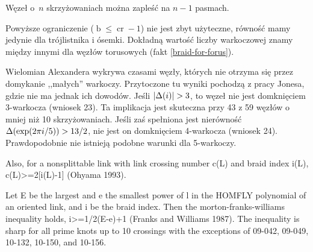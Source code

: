 \begin{proposition}
    Węzeł o~$n$ skrzyżowaniach można zapleść na $n - 1$ pasmach.
\end{proposition}

Powyższe ograniczenie ($\operatorname{b} \le \operatorname{cr} - 1$) nie jest zbyt użyteczne, równość mamy jedynie dla trójlistnika i ósemki.
Dokładną wartość liczby warkoczowej znamy między innymi dla węzłów torusowych (fakt \ref{braid-for-forus}).

Wielomian Alexandera wykrywa czasami węzły, których nie otrzyma się przez domykanie ,,małych'' warkoczy.
Przytoczone tu wyniki pochodzą z pracy \cite{jones85} Jonesa, gdzie nie ma jednak ich dowodów.
Jeśli $|\Delta(i)| > 3$, to węzeł nie jest domknięciem 3-warkocza (wniosek 23).
Ta implikacja jest skuteczna przy 43 z 59 węzłów o mniej niż 10 skrzyżowaniach.
Jeśli zaś spełniona jest nierówność $\Delta (\exp (2\pi i / 5)) > 13/2$, nie jest on domknięciem 4-warkocza (wniosek 24).
Prawdopodobnie nie istnieją podobne warunki dla 5-warkoczy.

\begin{tobedone}
Also, for a nonsplittable link with link crossing number c(L) and braid index i(L), c(L)>=2[i(L)-1] (Ohyama 1993).
\end{tobedone}

\begin{tobedone}
Let E be the largest and e the smallest power of l in the HOMFLY polynomial of an oriented link, and i be the braid index. Then the morton-franks-williams inequality holds, i>=1/2(E-e)+1 (Franks and Williams 1987). The inequality is sharp for all prime knots up to 10 crossings with the exceptions of 09-042, 09-049, 10-132, 10-150, and 10-156.
\end{tobedone}


